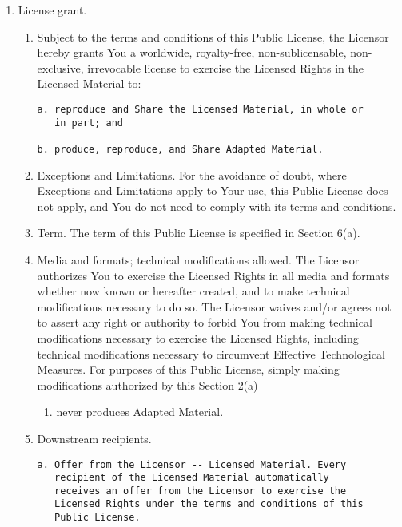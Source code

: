 \documentclass[]{article}
\providecommand{\tightlist}{%
  \setlength{\itemsep}{0pt}\setlength{\parskip}{0pt}}
\begin{document}
\begin{enumerate}
\def\labelenumi{\alph{enumi}.}
\item
  License grant.

  \begin{enumerate}
  \def\labelenumii{\arabic{enumii}.}
  \item
    Subject to the terms and conditions of this Public License, the
    Licensor hereby grants You a worldwide, royalty-free,
    non-sublicensable, non-exclusive, irrevocable license to exercise
    the Licensed Rights in the Licensed Material to:

\begin{verbatim}
a. reproduce and Share the Licensed Material, in whole or
   in part; and

b. produce, reproduce, and Share Adapted Material.
\end{verbatim}
  \item
    Exceptions and Limitations. For the avoidance of doubt, where
    Exceptions and Limitations apply to Your use, this Public License
    does not apply, and You do not need to comply with its terms and
    conditions.
  \item
    Term. The term of this Public License is specified in Section 6(a).
  \item
    Media and formats; technical modifications allowed. The Licensor
    authorizes You to exercise the Licensed Rights in all media and
    formats whether now known or hereafter created, and to make
    technical modifications necessary to do so. The Licensor waives
    and/or agrees not to assert any right or authority to forbid You
    from making technical modifications necessary to exercise the
    Licensed Rights, including technical modifications necessary to
    circumvent Effective Technological Measures. For purposes of this
    Public License, simply making modifications authorized by this
    Section 2(a)

    \begin{enumerate}
    \def\labelenumiii{(\arabic{enumiii})}
    \setcounter{enumiii}{3}
    \tightlist
    \item
      never produces Adapted Material.
    \end{enumerate}
  \item
    Downstream recipients.

\begin{verbatim}
a. Offer from the Licensor -- Licensed Material. Every
   recipient of the Licensed Material automatically
   receives an offer from the Licensor to exercise the
   Licensed Rights under the terms and conditions of this
   Public License.


\end{verbatim}
\end{enumerate}
\end{enumerate}
\end{document}

